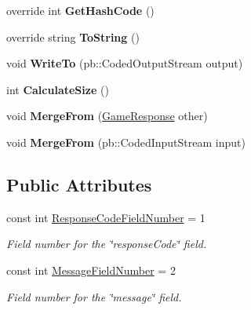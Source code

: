 \begin{DoxyCompactItemize}
override int {\bfseries Get\+Hash\+Code} ()
\item 
\mbox{\label{class_jcoinche_1_1_google_1_1_protobuf_1_1_game_response_ae4597e6e8434ad82efc79211efc7d2d9}} 
override string {\bfseries To\+String} ()
\item 
\mbox{\label{class_jcoinche_1_1_google_1_1_protobuf_1_1_game_response_a67ad100189a68a68a42b50e3afa09343}} 
void {\bfseries Write\+To} (pb\+::\+Coded\+Output\+Stream output)
\item 
\mbox{\label{class_jcoinche_1_1_google_1_1_protobuf_1_1_game_response_a4a4d9698e16a80c72cef496d449b9be3}} 
int {\bfseries Calculate\+Size} ()
\item 
\mbox{\label{class_jcoinche_1_1_google_1_1_protobuf_1_1_game_response_aa31f7fbc3299ffd17c2c31bbcb2daa36}} 
void {\bfseries Merge\+From} (\hyperlink{class_jcoinche_1_1_google_1_1_protobuf_1_1_game_response}{Game\+Response} other)
\item 
\mbox{\label{class_jcoinche_1_1_google_1_1_protobuf_1_1_game_response_a5fe0d390ab748a028c93b1526580468b}} 
void {\bfseries Merge\+From} (pb\+::\+Coded\+Input\+Stream input)
\end{DoxyCompactItemize}
\subsection*{Public Attributes}
\begin{DoxyCompactItemize}
\item 
const int \hyperlink{class_jcoinche_1_1_google_1_1_protobuf_1_1_game_response_ae8ef09fcb2b9c7f69f0361959e9b818d}{Response\+Code\+Field\+Number} = 1
\begin{DoxyCompactList}\small\item\em Field number for the \char`\"{}response\+Code\char`\"{} field.\end{DoxyCompactList}\item 
const int \hyperlink{class_jcoinche_1_1_google_1_1_protobuf_1_1_game_response_a263587f82936f9e7367f838b7ca082d6}{Message\+Field\+Number} = 2
\begin{DoxyCompactList}\small\item\em Field number for the \char`\"{}message\char`\"{} field.\end{DoxyCompactList}\end{DoxyCompactItemize}
